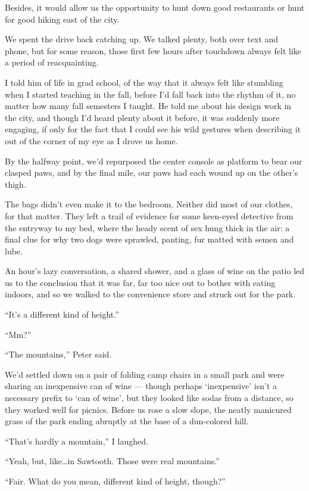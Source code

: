 Besides, it would allow us the opportunity to hunt down good restaurants or hunt for good hiking east of the city.

We spent the drive back catching up. We talked plenty, both over text and phone, but for some reason, those first few hours after touchdown always felt like a period of reacquainting.

I told him of life in grad school, of the way that it always felt like stumbling when I started teaching in the fall, before I'd fall back into the rhythm of it, no matter how many fall semesters I taught. He told me about his design work in the city, and though I'd heard plenty about it before, it was suddenly more engaging, if only for the fact that I could see his wild gestures when describing it out of the corner of my eye as I drove us home.

By the halfway point, we'd repurposed the center console as platform to bear our clasped paws, and by the final mile, our paws had each wound up on the other's thigh.

The bags didn't even make it to the bedroom. Neither did most of our clothes, for that matter. They left a trail of evidence for some keen-eyed detective from the entryway to my bed, where the heady scent of sex hung thick in the air: a final clue for why two dogs were sprawled, panting, fur matted with semen and lube.

An hour's lazy conversation, a shared shower, and a glass of wine on the patio led us to the conclusion that it was far, far too nice out to bother with eating indoors, and so we walked to the convenience store and struck out for the park.

``It's a different kind of height.''

``Mm?''

``The mountains,'' Peter said.

We'd settled down on a pair of folding camp chairs in a small park and were sharing an inexpensive can of wine --- though perhaps `inexpensive' isn't a necessary prefix to `can of wine', but they looked like sodas from a distance, so they worked well for picnics. Before us rose a slow slope, the neatly manicured grass of the park ending abruptly at the base of a dun-colored hill.

``That's hardly a mountain,'' I laughed.

``Yeah, but, like\ldots{}in Sawtooth. Those were real mountains.''

``Fair. What do you mean, different kind of height, though?''

